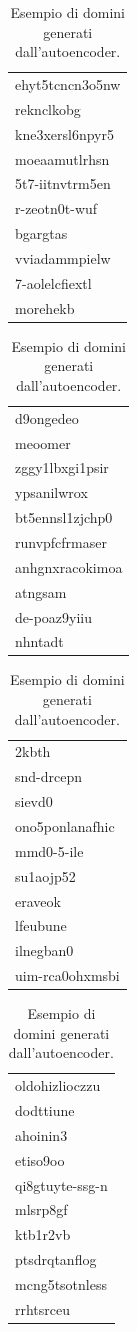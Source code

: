 \begin{table}[!hbp]
\centering
	\begin{tabular}{l}
	\toprule
	ehyt5tcncn3o5nw \\
	reknclkobg \\
	kne3xersl6npyr5 \\
	moeaamutlrhsn \\
	5t7-iitnvtrm5en \\
	r-zeotn0t-wuf \\
	bgargtas \\
	vviadammpielw \\
	7-aolelcfiextl \\
	morehekb \\
	\bottomrule
	\end{tabular}
	\begin{tabular}{l}
	\toprule
	d9ongedeo  \\
	meoomer \\
	zggy1lbxgi1psir \\
	ypsanilwrox \\
	bt5ennsl1zjchp0 \\
	runvpfcfrmaser \\
	anhgnxracokimoa \\
	atngsam \\
	de-poaz9yiiu \\
	nhntadt \\
	\bottomrule
	\end{tabular}
	\begin{tabular}{l}
	\toprule
	2kbth \\
	snd-drcepn \\
	sievd0 \\
	ono5ponlanafhic \\
	mmd0-5-ile \\
	su1aojp52 \\
	eraveok \\
	lfeubune \\
	ilnegban0 \\
	uim-rca0ohxmsbi \\
	\bottomrule
	\end{tabular}
	\begin{tabular}{l}
	\toprule
	oldohizlioczzu \\
	dodttiune \\
	ahoinin3 \\
	etiso9oo \\
	qi8gtuyte-ssg-n \\
	mlsrp8gf \\
	ktb1r2vb \\
	ptsdrqtanflog \\
	mcng5tsotnless \\
	rrhtsrceu \\
	\bottomrule
	\end{tabular}

\caption{Esempio di domini generati dall'autoencoder. \label{tab:autoenc}}
\end{table}

